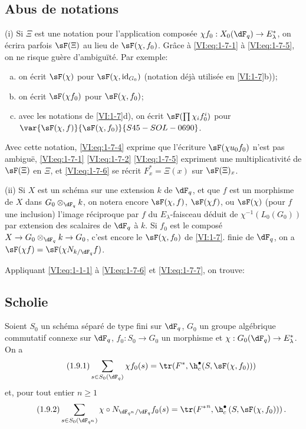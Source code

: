 \subsection{Abus de notations}\label{VI:1-8}

(i) Si $\Xi$ est une notation pour l'application composée 
$\chi f_0:X_0(\dF_q) \to E_\lambda^\ast$, on écrira parfois $\sF(\Xi)$ au 
lieu de $\sF(\chi,f_0)$. Grâce à \eqref{VI:eq:1-7-1} à \eqref{VI:eq:1-7-5}, 
on ne risque guère d'ambiguïté. Par exemple:
\begin{enumerate}[a)]
  \item on écrit $\sF(\chi)$ pour $\sF(\chi,\operatorname{id}_{G_0})$ 
    (notation déjà utilisée en \ref{VI:1-7}b)); 
  \item on écrit $\sF(\chi f_0)$ pour $\sF(\chi,f_0)$;
  \item avec les notations de \ref{VI:1-7}d), on écrit 
    $\sF(\prod \chi_i f_0^i)$ pour $\var{\sF(\chi,f)}{\sF(\chi,f_0)}{S45-SOL-0690}$. 
\end{enumerate}

Avec cette notation, \eqref{VI:eq:1-7-4} exprime que l'écriture 
$\sF(\chi u_0 f_0)$ n'est pas ambiguë, \eqref{VI:eq:1-7-1} \eqref{VI:eq:1-7-2} 
\eqref{VI:eq:1-7-5} expriment une multiplicativité de $\sF(\Xi)$ en $\Xi$, 
et \eqref{VI:eq:1-7-6} se récrit $F_x^\ast = \Xi(x)$ sur $\sF(\Xi)_x$.

(ii) Si $X$ est un schéma sur une extension $k$ de $\dF_q$, et que $f$ est un 
morphisme de $X$ dans $G_0\otimes_{\dF_q} k$, on notera encore $\sF(\chi,f)$, 
$\sF(\chi f)$, ou $\sF(\chi)$ (pour $f$ une inclusion) l'image réciproque par 
$f$ du $E_\lambda$-faisceau déduit de $\chi^{-1}(L_0(G_0))$ par extension des 
scalaires de $\dF_q$ à $k$. Si $f_0$ est le composé 
$X\to G_0\otimes_{\dF_q} k \to G_0$, c'est encore le $\sF(\chi,f_0)$ de 
\ref{VI:1-7}.  finie de $\dF_q$, on a 
$\sF(\chi f) = \sF(\chi N_{k/\dF_q} f)$. 

Appliquant \eqref{VI:eq:1-1-1} à \eqref{VI:eq:1-7-6} et \eqref{VI:eq:1-7-7}, 
on trouve: 





\subsection{Scholie}\label{VI:1-9}
Soient $S_0$ un schéma séparé de type fini sur $\dF_q$, $G_0$ un groupe 
algébrique commutatif connexe sur $\dF_q$, $f_0:S_0\to G_0$ un morphisme et 
$\chi:G_0(\dF_q) \to E_\lambda^\ast$. On a 
\begin{equation*}\tag{1.9.1}\label{VI:eq:1-9-1}
  \sum_{s\in S_0(\dF_q)} \chi f_0(s) = \tr(F^\ast,\h_c^\bullet(S,\sF(\chi,f_0))) 
\end{equation*}
et, pour tout entier $n\geqslant 1$
\begin{equation*}\tag{1.9.2}\label{VI:eq:1-9-2}
  \sum_{s\in S_0(\dF_{q^n})} \chi\circ N_{\dF_{q^n}/\dF_q} f_0(s) = \tr({F^\ast}^n, \h_c^\bullet\left(S,\sF(\chi,f_0))\right) \text{.}
\end{equation*}





